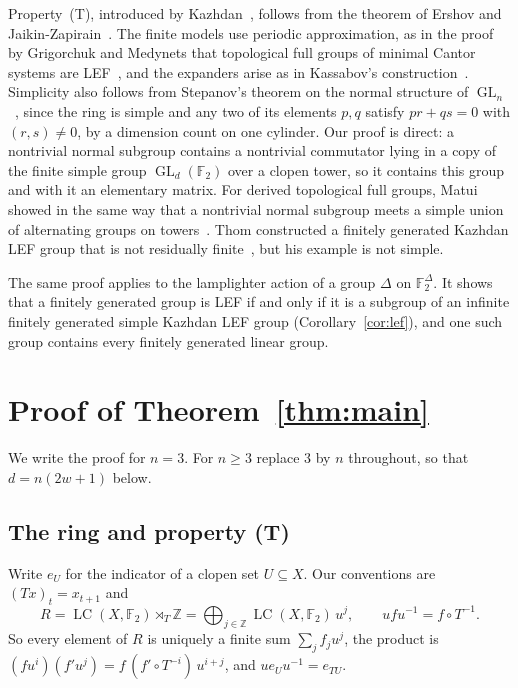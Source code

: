 \documentclass[11pt]{amsart}
\newcommand{\F}{\mathbb F}
\newcommand{\Z}{\mathbb Z}
\newcommand{\LC}{\operatorname{LC}}
\newcommand{\GL}{\operatorname{GL}}
\begin{document}
Property~\textup{(T)}, introduced by Kazhdan~\cite{Kazhdan}, follows from
the theorem of Ershov and Jaikin-Zapirain~\cite{EJZ}. The finite models
use periodic approximation, as in the proof by Grigorchuk and Medynets
that topological full groups of minimal Cantor systems are
LEF~\cite[Theorem~2.6]{GM}, and the expanders arise as in Kassabov's
construction~\cite{Kassabov}. Simplicity also follows from Stepanov's
theorem on the normal structure of $\GL_n$~\cite[Theorem~4.4]{Stepanov},
since the ring is simple and any two of its elements $p,q$ satisfy
$pr+qs=0$ with $(r,s)\ne0$, by a dimension count on one cylinder. Our
proof is direct: a nontrivial normal subgroup contains a nontrivial
commutator lying in a copy of the finite simple group $\GL_d(\F_2)$ over
a clopen tower, so it contains this group and with it an elementary
matrix. For derived topological full groups, Matui showed in the same way
that a nontrivial normal subgroup meets a simple union of alternating
groups on towers~\cite[Lemma~3.4 and Theorem~4.9]{Matui}. Thom
constructed a finitely generated Kazhdan LEF group that is not residually
finite~\cite{Thom}, but his example is not simple.

The same proof applies to the lamplighter action of a group $\Delta$ on
$\F_2^{\Delta}$. It shows that a finitely generated group is LEF if and
only if it is a subgroup of an infinite finitely generated simple Kazhdan
LEF group (Corollary~\ref{cor:lef}), and one such group contains every
finitely generated linear group.

\section{Proof of Theorem~\ref{thm:main}}

We write the proof for $n=3$. For $n\ge3$ replace $3$ by $n$ throughout,
so that $d=n(2w+1)$ below.

\subsection*{The ring and property (T)}
Write $e_U$ for the indicator of a clopen set $U\subseteq X$. Our
conventions are $(Tx)_t=x_{t+1}$ and
\[
 R=\LC(X,\F_2)\rtimes_T\Z=\bigoplus_{j\in\Z}\LC(X,\F_2)\,u^j,
 \qquad ufu^{-1}=f\circ T^{-1}.
\]
So every element of $R$ is uniquely a finite sum $\sum_jf_ju^j$, the
product is $(fu^i)(f'u^j)=f\,(f'\circ T^{-i})\,u^{i+j}$, and
$ue_Uu^{-1}=e_{TU}$.
\end{document}
